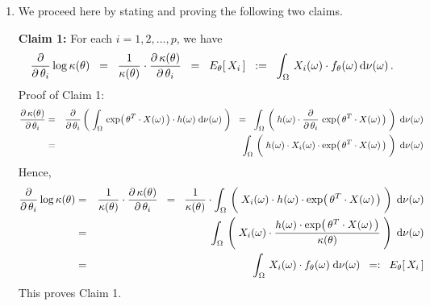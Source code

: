 \begin{enumerate}
\item
	We proceed here by stating and proving the following two claims.
	
	\vskip 0.3cm
	\noindent
	\textbf{Claim 1:}\quad
	For each $i = 1, 2, \ldots, p$, we have
	\begin{equation*}
	\dfrac{\partial}{\partial\,\theta_{i}} \log \kappa(\theta)
	\;\; = \;\;
		\dfrac{1}{\kappa(\theta)} \cdot \dfrac{\partial\,\kappa(\theta)}{\partial\,\theta_{i}}
	\;\; = \;\;
		E_{\theta}\!\left[\,X_{i}\,\right]
	\;\; := \;\;
		\int_{\Omega}\, X_{i}(\omega) \cdot f_{\theta}(\omega)\,\textnormal{d}\nu(\omega)\,.
	\end{equation*}
	Proof of Claim 1:\quad
	\begin{eqnarray*}
	\dfrac{\partial\,\kappa(\theta)}{\partial\,\theta_{i}}
	& = &
		\dfrac{\partial}{\partial\,\theta_{i}}
		\left(\;
			\int_{\Omega}\,
			\exp\!\left(\,\theta^{T}\cdot X(\omega)\,\right)\cdot h(\omega)
			\;\d\nu(\omega)
		\;\right)
	\;\; = \;\;
		\int_{\Omega}\,
			\left(\;
			h(\omega)
			\cdot
			\dfrac{\partial}{\partial\,\theta_{i}}\,
			\exp\!\left(\,\theta^{T}\cdot X(\omega)\,\right)
			\;\right)
		\;\d\nu(\omega)
	\\
	&=&
		\int_{\Omega}\,
			\left(\;
			\overset{{\color{white}-}}{h}(\omega)
			\cdot
			X_{i}(\omega)
			\cdot
			\exp\!\left(\,\theta^{T}\cdot X(\omega)\,\right)
			\;\right)
		\;\d\nu(\omega)
	\end{eqnarray*}
	Hence,
	\begin{eqnarray*}
	\dfrac{\partial}{\partial\,\theta_{i}} \log \kappa(\theta)
	&=&
		\dfrac{1}{\kappa(\theta)} \cdot \dfrac{\partial\,\kappa(\theta)}{\partial\,\theta_{i}}
	\;\; = \;\;
		\dfrac{1}{\kappa(\theta)}
		\cdot
		\int_{\Omega}\,
			\left(\;
			X_{i}(\omega)
			\cdot
			\overset{{\color{white}-}}{h}(\omega)
			\cdot
			\exp\!\left(\,\theta^{T}\cdot X(\omega)\,\right)
			\;\right)
		\;\d\nu(\omega)
	\\
	& = &
		\int_{\Omega}\,
			\left(\;
			X_{i}(\omega)
			\cdot
			\dfrac{
				h(\omega) \cdot \exp\!\left(\,\theta^{T}\cdot X(\omega)\,\right)
				}{
				\kappa(\theta)
				}
			\;\right)
		\;\d\nu(\omega)
	\\
	& = &
		\int_{\Omega}\,
			X_{i}(\omega) \cdot f_{\theta}(\omega)
		\;\d\nu(\omega)
	\;\; =: \;\;
		E_{\theta}\!\left[\,X_{i}\,\right]
	\end{eqnarray*}
	This proves Claim 1.
	

\end{enumerate}
